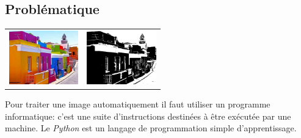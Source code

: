 \documentclass[a4paper,11pt]{article}
\begin{document}
\begin{Form}
\section{Problématique}
\begin{center}
\begin{tabular}{cc}
\includegraphics[width=3cm]{ressources/maisons-colorees.png}
 & 
\includegraphics[width=3cm]{ressources/maisons-colorees-NB.png}
 \\ 
\end{tabular} 
\end{center}
Pour traiter une image automatiquement il faut utiliser un programme informatique: c'est une suite d'instructions destinées à être exécutée par une machine. Le \emph{Python} est un langage de programmation simple d'apprentissage.
\begin{center}
\end{center}

\end{Form}
\end{document}
